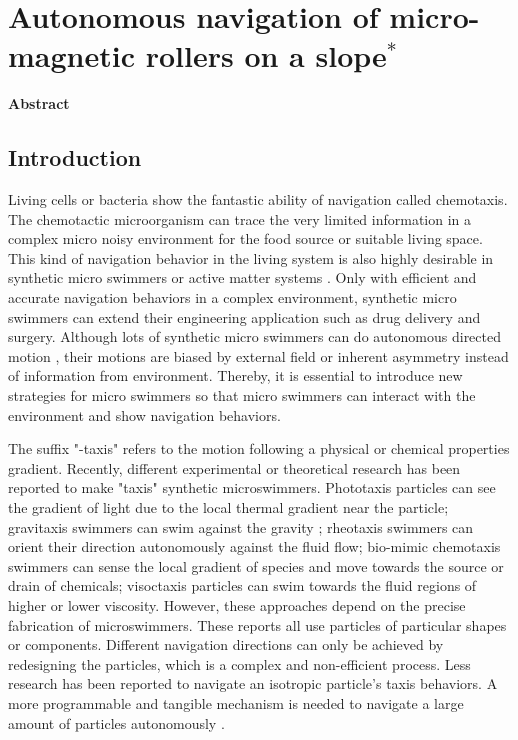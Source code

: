 \chapter{Autonomous navigation of micro-magnetic rollers on a slope$^{*}$} 
\begin{center}
\vspace*{1\baselineskip}
\textbf{Abstract}
\end{center}

\section{Introduction}
Living cells or bacteria show the fantastic ability of navigation called chemotaxis\autocite{alon1999robustness,adler1975chemotaxis}. The chemotactic microorganism can trace the very limited information in  a complex micro noisy environment for the food source or suitable living space\autocite{keller1971model}. This kind of navigation behavior in the living system is also highly desirable in synthetic micro swimmers or active matter systems \autocite{patteson2016active}. Only with efficient and accurate navigation behaviors in a complex environment, synthetic micro swimmers can extend their engineering application  such as drug delivery and surgery\autocite{de2017micromotor,xu2018sperm}. Although lots of synthetic  micro swimmers can do autonomous directed motion \autocite{yan2016reconfiguring,dou2016directed,lee2019directed,baker2019shape}, their motions are biased by  external field or inherent asymmetry instead of information from environment. Thereby, it is essential to introduce new strategies for micro swimmers so that micro swimmers can interact with the environment and show navigation behaviors.  

The suffix "-taxis" refers to the motion following a physical or chemical properties gradient. Recently, different experimental or theoretical research has been reported to make "taxis" synthetic microswimmers. Phototaxis particles can see the gradient of light due to the local thermal gradient near the particle\autocite{yu2019phototaxis,dai2016programmable,lozano2016phototaxis,chen2017light}; gravitaxis swimmers can swim against the gravity \autocite{campbell2013gravitaxis,ten2014gravitaxis}; rheotaxis swimmers can orient their direction autonomously against the fluid flow\autocite{Palacci2015,ren2017rheotaxis,brosseau2019relating}; bio-mimic chemotaxis swimmers can sense the local gradient of species and move towards the source or drain of chemicals\autocite{dou2019autonomous}; visoctaxis particles can swim towards the fluid regions of higher or lower viscosity\autocite{liebchen2018viscotaxis}. However, these approaches depend on the precise fabrication of microswimmers.
These reports all use particles of particular shapes or components. Different navigation directions can only be achieved by redesigning the particles, which is a complex and non-efficient process. Less research has been reported to navigate an isotropic particle's taxis behaviors. A more programmable and tangible mechanism is needed to navigate a large amount of particles autonomously \autocite{dou2019autonomous}.

